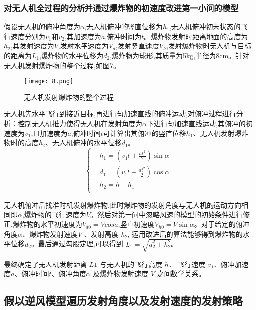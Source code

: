 \documentclass[normalsize]{ctexart}
\begin{document}
\subsubsection{对无人机全过程的分析并通过爆炸物的初速度改进第一小问的模型}
\par 假设无人机的俯冲角度为$\alpha$,无人机俯冲的竖直位移为$h_1$,无人机俯冲初末状态的飞行速度分别为$v_1$和$v_2$,其加速度为$a$,俯冲时间为$t$。爆炸物发射时距离地面的高度为$h_2$,其发射速度为$V$,发射水平速度为$V_d$,发射竖直速度$V_h$,发射爆炸物时无人机与目标的距离为$L_1$,爆炸物的水平位移为$d_2$,爆炸物为球形,其质量为5kg,半径为8cm。针对无人机发射爆炸物的整个过程,如图7。
\begin{figure}[h]
	
	\centering
	\texttt{[image: 8.png]}
	\caption{无人机发射爆炸物的整个过程}
	
\end{figure}
\par 
无人机先水平飞行到接近目标,再进行匀加速直线的俯冲运动,对俯冲过程进行分析：控制无人机推力使得无人机在发射角度为$\alpha$下进行匀加速直线运动,其俯冲的初速度为$v_1$,且加速度为$a$,俯冲时间$t$可计算出其俯冲的竖直位移$h_1$、无人机发射爆炸物时的高度$h_2$、无人机俯冲的水平位移$d_1$。
\begin{equation}
	\begin{cases}
		&	h_1=(v_1t+\frac{at^2}{2})\sin\alpha\\
		&   d_1=(v_1t+\frac{at^2}{2})\cos\alpha\\
		&   h_2=h-h_1\\
	\end{cases}		
\end{equation}
\par 无人机俯冲后找准时机发射爆炸物,此时爆炸物的发射角度与无人机的运动方向相同即$\alpha$,爆炸物的飞行速度为$V$。然后对第一问中忽略风速的模型的初始条件进行修正,爆炸物的水平初速度为$V_{d0}=Vcosa$,竖直初速度$V_{h0}=V\sin\alpha$。对于给定的俯冲角度$α$、爆炸物发射速度$ V$ 、发射高度 $h_2$, 运用改进后的算法能够得到爆炸物的水平位移$d_2$。最后通过勾股定理,可以得到 $L_1 = \sqrt{d_2^2 + h_2^2} $。
\par 最终确定了无人机发射距离 $L1$ 与无人机的飞行高度 $h$、 飞行速度 $v_1$、俯冲加速度$a$、俯冲时间$t$、俯冲角度$\alpha$ 及爆炸物发射速度 $V$ 之间数学关系。
\subsection{假以逆风模型遍历发射角度以及发射速度的发射策略}
\end{document}
